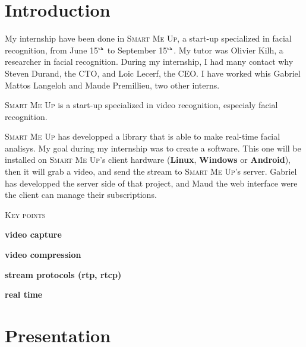 \documentclass[a4paper,11pt]{custom}
\newcommand{\smu}{\textsc{Smart Me Up}}
\newcommand{\linux}{\textbf{Linux}}
\newcommand{\win}{\textbf{Windows}}
\newcommand{\android}{\textbf{Android}}
\newcommand{\nth}[1]{#1$^{\text{\tiny th}}$}
\begin{document}

\chapter{Introduction}

My internship have been done in \smu, a start-up specialized in facial
recognition, from June \nth{15} to September \nth{15}. My tutor was Olivier
Kilh, a researcher in facial recognition. During my internship, I had many
contact why Steven Durand, the CTO, and Loic Lecerf, the CEO. I have worked whis
Gabriel Mattos Langeloh and Maude Premillieu, two other interns.

\smu{} is a start-up specialized in video recognition, especialy facial
recognition.

\smu{} has developped a library that is able to make real-time facial analisys.
My goal during my internship was to create a software. This one will be
installed on \smu's client hardware (\linux, \win{} or \android), then it will
grab a video, and send the stream to \smu's server. Gabriel has developped the
server side of that project, and Maud the web interface were the client can
manage their subscriptions.

\vspace{\fill}

\begin{center}
\textsc{\textsc{Key points}}
\end{center}

\begin{itemize}
\begin{multicols}{2}
\item \textbf{video capture}
\item \textbf{video compression}
\item \textbf{stream protocols (rtp, rtcp)}
\item \textbf{real time}
\end{multicols}
\end{itemize}

\chapter{Presentation}
\end{document}
